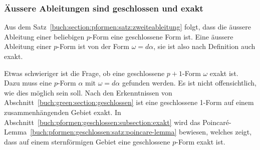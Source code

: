 %
%
\subsubsection{Äussere Ableitungen sind geschlossen und exakt}
Aus dem Satz~\ref{buch:section:pformen:satz:zweiteableitung} folgt,
dass die äussere Ableitung einer beliebigen $p$-Form eine geschlossene
Form ist.
Eine äussere Ableitung einer $p$-Form ist von der Form $\omega=d\alpha$,
sie ist also nach Definition auch exakt.

Etwas schwieriger ist die Frage, ob eine geschlossene $p+1$-Form $\omega$
exakt ist.
Dazu muss eine $p$-Form $\alpha$ mit $\omega=d\alpha$ gefunden werden.
Es ist nicht offensichtlich, wie dies möglich sein soll.
Nach den Erkenntnissen von Abschnitt~\ref{buch:green:section:geschlossen}
ist eine geschlossene 1-Form auf einem zusammenhängenden Gebiet exakt.
In Abschnitt~\ref{buch:pformen:geschlossen:subsection:exakt}
wird das Poincaré-Lemma~\ref{buch:pformen:geschlossen:satz:poincare-lemma}
bewiesen, welches zeigt, dass auf einem sternförmigen Gebiet eine
geschlossene $p$-Form exakt ist.

